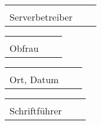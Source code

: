 \vspace{0.5cm}
\begin{tabular}{p{7cm}p{0.5cm}l}
\dotfill \\
Serverbetreiber
\end{tabular}
\hfill
\begin{tabular}{p{7cm}p{0.5cm}l}
\dotfill \\
Obfrau
\end{tabular}

\vspace{0.5cm}
\begin{tabular}{p{7cm}p{0.5cm}l}
\dotfill \\
Ort, Datum
\end{tabular}
\hfill
\begin{tabular}{p{7cm}p{0.5cm}l}
\dotfill \\
Schriftführer
\end{tabular}
